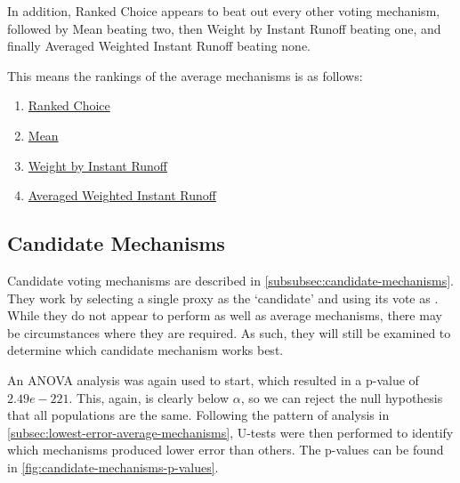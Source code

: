 In addition, Ranked Choice appears to beat out every other voting mechanism, followed
by Mean beating two, then Weight by Instant Runoff beating one, and finally Averaged
Weighted Instant Runoff beating none.
\begin{samepage}
    This means the rankings of the average mechanisms is as follows:
    \begin{enumerate}
        \item \hyperref[para:avg-ranked-choice]{Ranked Choice}
        \item \hyperref[para:mean]{Mean}
        \item \hyperref[para:avg-instant-runoff]{Weight by Instant Runoff}
        \item \hyperref[para:avg-weighted-instant-runoff]{Averaged Weighted Instant
        Runoff}
    \end{enumerate}
\end{samepage}

\subsection{Candidate Mechanisms}\label{subsec:lowest-error-candidate-mechanisms}
Candidate voting mechanisms are described in \autoref{subsubsec:candidate-mechanisms}.
They work by selecting a single proxy as the `candidate' and using its vote as
\systemtruth.
While they do not appear to perform as well as average mechanisms, there may be
circumstances where they are required.
As such, they will still be examined to determine which candidate mechanism works best.

An ANOVA analysis was again used to start, which resulted in a p-value of
$2.49e-221$.
This, again, is clearly below $\alpha$, so we can reject the null hypothesis that all
populations are the same.
Following the pattern of analysis in
\autoref{subsec:lowest-error-average-mechanisms}, U-tests were then performed to
identify which mechanisms produced lower error than others.
The p-values can be found in \autoref{fig:candidate-mechanisms-p-values}.

